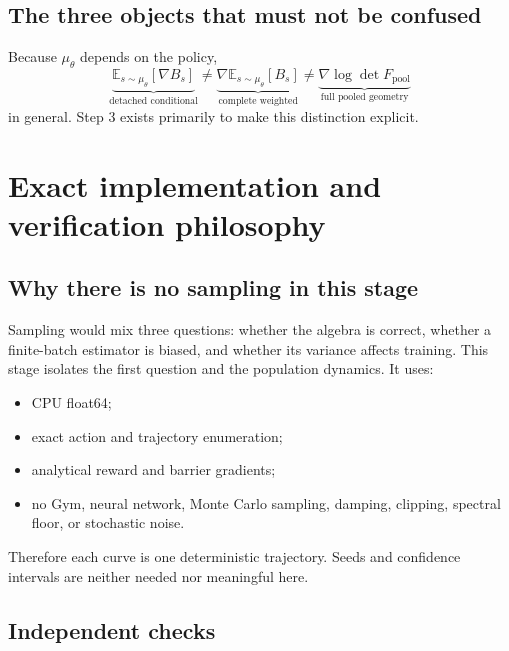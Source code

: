 \documentclass[10pt,a4paper]{article}
\newcommand{\pool}{\mathrm{pool}}
\newcommand{\E}{\mathbb{E}}
\begin{document}
\subsection{The three objects that must not be confused}

Because $\mu_\theta$ depends on the policy,
\begin{equation}
\underbrace{\E_{s\sim\mu_\theta}[\nabla B_s]}_{\text{detached conditional}}
\neq
\underbrace{\nabla\E_{s\sim\mu_\theta}[B_s]}_{\text{complete weighted}}
\neq
\underbrace{\nabla\log\det F_{\pool}}_{\text{full pooled geometry}}
\end{equation}
in general.  Step 3 exists primarily to make this distinction explicit.

\section{Exact implementation and verification philosophy}

\subsection{Why there is no sampling in this stage}

Sampling would mix three questions: whether the algebra is correct, whether a
finite-batch estimator is biased, and whether its variance affects training.
This stage isolates the first question and the population dynamics.  It uses:
\begin{itemize}
\item CPU float64;
\item exact action and trajectory enumeration;
\item analytical reward and barrier gradients;
\item no Gym, neural network, Monte Carlo sampling, damping, clipping,
spectral floor, or stochastic noise.
\end{itemize}
Therefore each curve is one deterministic trajectory.  Seeds and confidence
intervals are neither needed nor meaningful here.

\subsection{Independent checks}
\end{document}

